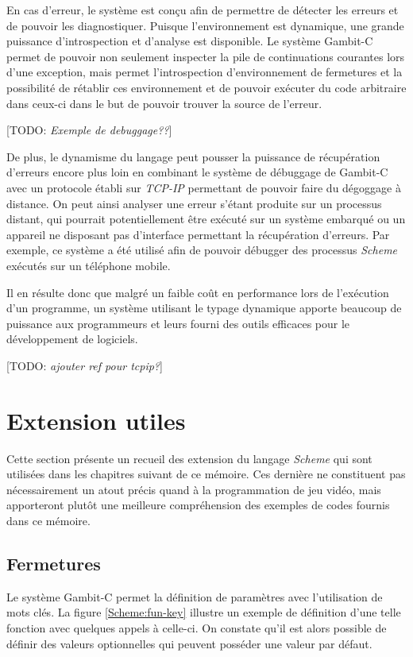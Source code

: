 \documentclass[12pt,twoside,letterpaper,francais]{book}
\newcommand{\todo}[1]{[TODO: {\it #1}]}
\newcommand{\Schemelang}{{\textit{Scheme }}}
\begin{document}
En cas d'erreur, le système est conçu afin de permettre de détecter
les erreurs et de pouvoir les diagnostiquer. Puisque l'environnement
est dynamique, une grande puissance d'introspection et d'analyse est
disponible. Le système Gambit-C permet de pouvoir non seulement
inspecter la pile de continuations courantes lors d'une exception,
mais permet l'introspection d'environnement de fermetures et la
possibilité de rétablir ces environnement et de pouvoir exécuter du
code arbitraire dans ceux-ci dans le but de pouvoir trouver la source
de l'erreur.

\todo{Exemple de debuggage??}

De plus, le dynamisme du langage peut pousser la puissance de
récupération d'erreurs encore plus loin en combinant le système de
débuggage de Gambit-C avec un protocole établi sur \textit{TCP-IP}
permettant de pouvoir faire du dégoggage à distance. On peut ainsi
analyser une erreur s'étant produite sur un processus distant, qui
pourrait potentiellement être exécuté sur un système embarqué ou un
appareil ne disposant pas d'interface permettant la récupération
d'erreurs. Par exemple, ce système a été utilisé afin de pouvoir
débugger des processus \Schemelang exécutés sur un téléphone mobile.

Il en résulte donc que malgré un faible coût en performance lors de
l'exécution d'un programme, un système utilisant le typage dynamique
apporte beaucoup de puissance aux programmeurs et leurs fourni des
outils efficaces pour le développement de logiciels.

\todo{ajouter ref pour tcpip?}


\FloatBarrier
\section{Extension utiles}
Cette section présente un recueil des extension du langage \Schemelang qui
sont utilisées dans les chapitres suivant de ce mémoire. Ces dernière
ne constituent pas nécessairement un atout précis quand à la
programmation de jeu vidéo, mais apporteront plutôt une meilleure
compréhension des exemples de codes fournis dans ce mémoire.


\FloatBarrier
\subsection{Fermetures}
Le système Gambit-C permet la définition de paramètres avec
l'utilisation de mots clés. La figure \ref{Scheme:fun-key} illustre un
exemple de définition d'une telle fonction avec quelques appels à
celle-ci. On constate qu'il est alors possible de définir des valeurs
optionnelles qui peuvent posséder une valeur par défaut.
\end{document}
